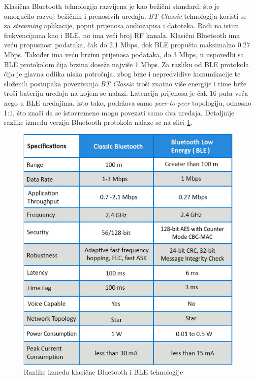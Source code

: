 Klasična Bluetooth tehnologija razvijena je kao bežični standard, što je omogućilo razvoj bežičnih i prenosivih uređaja. \textit{BT Classic} tehnologija koristi se za \textit{streaming} aplikacije, poput prijenosa audiozapisa i datoteka. Radi na istim frekvencijama kao i BLE, no ima veći broj RF kanala. Klasični Bluetooth ima veću propusnost podataka, čak do 2.1 Mbps, dok BLE propušta maksimalno 0.27 Mbps. Također ima veću brzinu prijenosa podataka, do 3 Mbps, u usporedbi sa BLE protokolom čija brzina doseže najviše 1 Mbps. Za razliku od BLE protokola čija je glavna odlika niska potrošnja,  zbog brze i nepredvidive komunikacije te složenih postupaka povezivanja \textit{BT Classic} troši znatno više energije i time brže troši bateriju uređaja na kojem se nalazi. Latencija prijenosa je čak 16 puta veća nego u BLE uređajima. Isto tako, podržava samo \textit{peer-to-peer} topologiju, odnosno 1:1, što znači da se istovremeno mogu povezati samo dva uređaja. Detaljnije razlike između verzija Bluetooth protokola nalaze se na slici \ref{fig:blevsbt}. \cite{blevsbt}

\begin{figure}[ht]
	\centering
	\includegraphics[scale=0.6]{imgs/blevsbt}
	\caption{Razlike između klasične Bluetooth i BLE tehnologije \cite{blevsbt}}
	\label{fig:blevsbt}
\end{figure}

